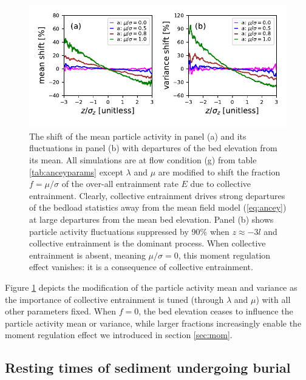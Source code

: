 \begin{figure}[!htbp]
	\includegraphics[width=\linewidth,keepaspectratio]{./figures/ch3/colent-suppression.pdf}
	\caption{The shift of the mean particle activity in panel (a) and its fluctuations in panel (b) with departures of the bed elevation from its mean. All simulations are at flow condition (g) from table \ref{tab:anceyparams} except $\lambda$ and $\mu$ are modified to shift the fraction $f=\mu/\sigma$ of the over-all entrainment rate $E$ due to collective entrainment. Clearly, collective entrainment drives strong departures of the bedload statistics away from the mean field model (\ref{eq:ancey}) at large departures from the mean bed elevation. Panel (b) shows particle activity fluctuations suppressed by 90\% when $z\approx -3l$ and collective entrainment is the dominant process. When collective entrainment is absent, meaning $\mu/\sigma=0$, this moment regulation effect vanishes: it is a consequence of collective entrainment.}
	\label{fig:colent}
\end{figure}
Figure \ref{fig:colent} depicts the modification of the particle activity mean and variance as the importance of collective entrainment is tuned (through $\lambda$ and $\mu$) with all other parameters fixed. When $f=0$, the bed elevation ceases to influence the particle activity mean or variance, while larger fractions increasingly enable the moment regulation effect we introduced in section \ref{sec:mom}.

\subsection{Resting times of sediment undergoing burial}
\label{sec:rtcdf}

